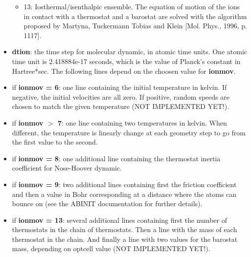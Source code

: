 \documentclass[a4paper,11pt]{report}
\begin{document}
\begin{itemize}
\begin{itemize}
      \item 13: Iosthermal/isenthalpic ensemble. The equation of motion of the ions in contact with a thermostat and a barostat are solved with the algorithm proposed by Martyna, Tuckermann Tobias and Klein [Mol. Phys., 1996, p. 1117].
      \end{itemize}
\item \textbf{dtion}: the time step for molecular dynamic, in atomic time units. One atomic time unit is 2.418884e-17 seconds, which is the value of Planck's constant in Hartree*sec. The following lines depend on the choosen value for \textbf{ionmov}.
\item  if \textbf{ionmov = 6}: one line containing the initial temperature in kelvin. If negative, the initial velocities are all zero. If positive, random speeds are chosen to match the given temperature (NOT IMPLEMENTED YET!).
\item  if \textbf{ionmov $>$ 7}: one line containing two temperatures in kelvin. When different, the temperature is linearly change at each geometry step to go from the first value to the second.
\item  if \textbf{ionmov = 8}: one additional line containing the thermostat inertia coefficient for Nose-Hoover dynamic.
\item  if \textbf{ionmov = 9}: two additional lines containing first the friction coefficient and then a value in Bohr corresponding at a distance where the atoms can bounce on (see the ABINIT documentation for further details).
\item  if \textbf{ionmov = 13}: several additional lines containing first the number of thermostats in the chain of thermostats. Then a line with the mass of each thermostat in the chain. And finally a line with two values for the barostat mass, depending on optcell value (NOT IMPLEMENTED YET!).
\end{itemize}
\end{document}
